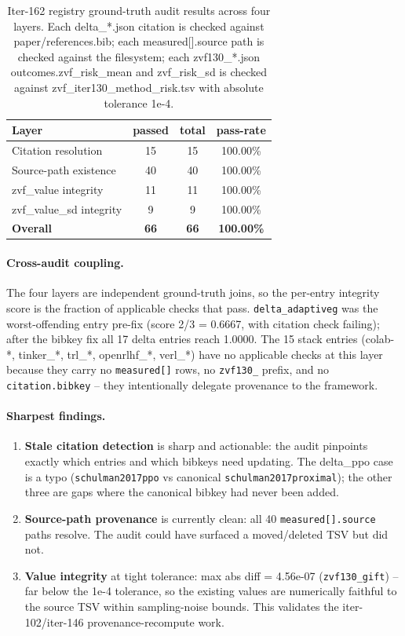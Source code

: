 \begin{table}[h]
\centering
\small
\begin{tabular}{lccc}
\hline
\textbf{Layer} & \textbf{passed} & \textbf{total} & \textbf{pass-rate} \\
\hline
Citation resolution       & 15 & 15 & 100.00\% \\
Source-path existence     & 40 & 40 & 100.00\% \\
zvf\_value integrity      & 11 & 11 & 100.00\% \\
zvf\_value\_sd integrity  &  9 &  9 & 100.00\% \\
\hline
\textbf{Overall}          & \textbf{66} & \textbf{66} & \textbf{100.00\%} \\
\hline
\end{tabular}
\caption{Iter-162 registry ground-truth audit results across four layers. Each
delta\_*.json citation is checked against paper/references.bib; each
measured[].source path is checked against the filesystem; each
zvf130\_*.json outcomes.zvf\_risk\_mean and zvf\_risk\_sd is checked against
zvf\_iter130\_method\_risk.tsv with absolute tolerance 1e-4.}
\label{tab:p6_iter162_layers}
\end{table}

\paragraph{Cross-audit coupling.}
The four layers are independent ground-truth joins, so the per-entry
integrity score is the fraction of applicable checks that pass.
\texttt{delta\_adaptiveg} was the worst-offending entry pre-fix
(score 2/3 = 0.6667, with citation check failing); after the bibkey fix
all 17 delta entries reach 1.0000. The 15 stack entries (colab-*,
tinker\_*, trl\_*, openrlhf\_*, verl\_*) have no applicable checks at this
layer because they carry no \texttt{measured[]} rows, no
\texttt{zvf130\_} prefix, and no \texttt{citation.bibkey} -- they
intentionally delegate provenance to the framework.

\paragraph{Sharpest findings.}
\begin{enumerate}
\item \textbf{Stale citation detection} is sharp and actionable: the audit
pinpoints exactly which entries and which bibkeys need updating. The
delta\_ppo case is a typo (\texttt{schulman2017ppo} vs canonical
\texttt{schulman2017proximal}); the other three are gaps where the
canonical bibkey had never been added.
\item \textbf{Source-path provenance} is currently clean: all 40
\texttt{measured[].source} paths resolve. The audit could have surfaced
a moved/deleted TSV but did not.
\item \textbf{Value integrity} at tight tolerance: max abs diff = 4.56e-07
(\texttt{zvf130\_gift}) -- far below the 1e-4 tolerance, so the existing
values are numerically faithful to the source TSV within sampling-noise
bounds. This validates the iter-102/iter-146 provenance-recompute work.
\end{enumerate}

